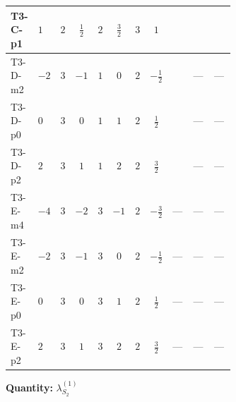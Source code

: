 \documentclass[8pt]{article}
\begin{document}
\begin{landscape}
\begin{longtable}{@{}llcccccc >{\raggedright\arraybackslash}p{0.21\linewidth} >{\raggedright\arraybackslash}p{0.21\linewidth} >{\raggedright\arraybackslash}p{0.21\linewidth}@{}}
\midrule
T3-C-p1 & $1$ & $2$ & $\frac{1}{2}$ & $2$ & $\frac{3}{2}$ & $3$ & $1$ & \scriptsize\adjustbox{max width=\linewidth}{$\begin{gathered} 6 {\lambda_{S_2}^{(1)}} T_{\nu}^{(2)}\end{gathered}$} & \scriptsize\adjustbox{max width=\linewidth}{$\begin{gathered} +\frac{9 {g_2}^4}{4}\end{gathered}$} & \scriptsize\adjustbox{max width=\linewidth}{$\begin{gathered} +{g_1}^2 \left(\frac{27 {g_2}^2}{2}-27 {\lambda_{S_2}^{(1)}}\right)\end{gathered}$} \\
\midrule
T3-D-m2 & $-2$ & $3$ & $-1$ & $1$ & $0$ & $2$ & $-\frac{1}{2}$ & \scriptsize\adjustbox{max width=\linewidth}{$\begin{gathered} 8 {\lambda_{S_2}^{(1)}} T_{\nu}^{(2)}\end{gathered}$} & --- & --- \\
\midrule
T3-D-p0 & $0$ & $3$ & $0$ & $1$ & $1$ & $2$ & $\frac{1}{2}$ & \scriptsize\adjustbox{max width=\linewidth}{$\begin{gathered} 8 {\lambda_{S_2}^{(1)}} T_{\nu}^{(2)}\end{gathered}$} & --- & --- \\
\midrule
T3-D-p2 & $2$ & $3$ & $1$ & $1$ & $2$ & $2$ & $\frac{3}{2}$ & \scriptsize\adjustbox{max width=\linewidth}{$\begin{gathered} 8 {\lambda_{S_2}^{(1)}} T_{\nu}^{(2)}\end{gathered}$} & --- & --- \\
\midrule
T3-E-m4 & $-4$ & $3$ & $-2$ & $3$ & $-1$ & $2$ & $-\frac{3}{2}$ & --- & --- & --- \\
\midrule
T3-E-m2 & $-2$ & $3$ & $-1$ & $3$ & $0$ & $2$ & $-\frac{1}{2}$ & --- & --- & --- \\
\midrule
T3-E-p0 & $0$ & $3$ & $0$ & $3$ & $1$ & $2$ & $\frac{1}{2}$ & --- & --- & --- \\
\midrule
T3-E-p2 & $2$ & $3$ & $1$ & $3$ & $2$ & $2$ & $\frac{3}{2}$ & --- & --- & --- \\
\midrule
\bottomrule
\end{longtable}
\clearpage
\noindent\textbf{Quantity: }$\lambda_{S_2}^{(1)}$\par\smallskip

\end{landscape}
\end{document}
